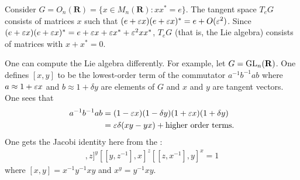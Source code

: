 \documentclass [11 pt, twoside] {article}
\begin{document}
\begin{example}[ ]\label{}\text{}
Consider $G = O_{n}(\mathbf{R}) = \{x\in M_{n}(\mathbf{R}) : xx^{*}=e\}$. 
The tangent space $T_{e}G$ consists of matrices $x$ such that $(e+\varepsilon x)(e+\varepsilon x) ^{*}=  e + O(\varepsilon^{2})$.
Since $(e+\varepsilon x) (e+\varepsilon x) ^{*} = e + \varepsilon x + \varepsilon x ^{*} + \varepsilon ^{2}xx^{*}$, $T_{e}G$ (that is, the Lie algebra) consists of matrices with $x+x^{*}=0$.
\end{example}

One can compute the Lie algebra differently.
For example, let $G=\operatorname{GL}_{n}(\mathbf{R})$.
One defines $[x,y]$ to be the lowest-order term of the commutator $a^{-1}b^{-1}ab$ where $a\approx 1+\varepsilon x$ and $b\approx 1+\delta y$ are elements of $G$ and $x$ and $y$ are tangent vectors. 
One sees that
\begin{align*}
	a^{-1}b^{-1}ab &= (1-\varepsilon x) (1-\delta y)  (1+\varepsilon x) (1+\delta y)\\
		       &= \varepsilon\delta (xy-yx) + \textrm{higher order terms.}
\end{align*}
One gets the Jacobi identity here from the :
\begin{align*}
	[[x,y^{-1}],z]^{y}[[y,z^{-1}],x]^{z}[[z,x^{-1}],y]^{x} = 1
\end{align*}
where $[x,y] = x^{-1}y^{-1}xy$ and $x^{y}=y^{-1}xy$.
\fi

\printindex
\end{document}

